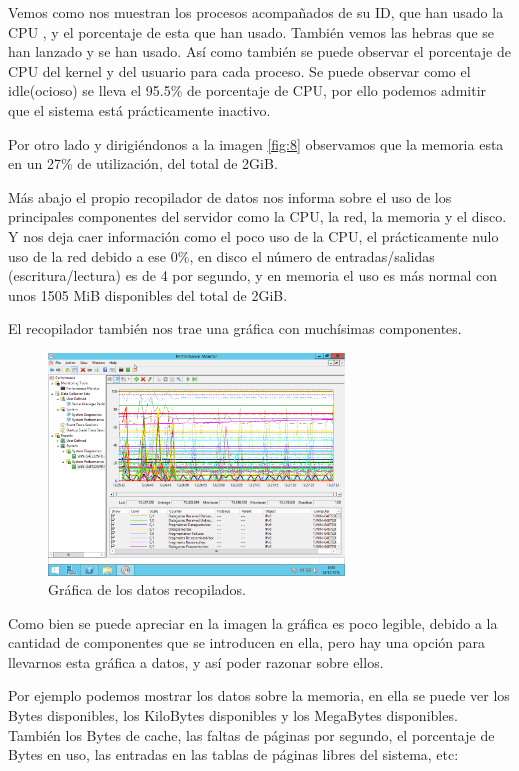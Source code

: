 Vemos como nos muestran los procesos acompañados de su ID, que han usado la CPU , y el porcentaje de esta que han usado. También vemos las hebras que se han lanzado y se han usado. Así como también se puede observar el porcentaje de CPU del kernel y del usuario para cada proceso.
Se puede observar como el idle(ocioso) se lleva el 95.5\% de porcentaje de CPU, por ello podemos admitir que el sistema está prácticamente inactivo.

Por otro lado y dirigiéndonos a la imagen \ref{fig:8} observamos que la memoria esta en un 27\% de utilización, del total de 2GiB.

Más abajo el propio recopilador de datos nos informa sobre el uso de los principales componentes del servidor como la CPU, la red, la memoria y el disco. Y nos deja caer información como el poco uso de la CPU, el prácticamente nulo uso de la red debido a ese 0\%, en disco el número de entradas/salidas (escritura/lectura) es de 4 por segundo, y en memoria el uso es más normal con unos 1505 MiB disponibles del total de 2GiB.

El recopilador también nos trae una gráfica con muchísimas componentes.

\begin{figure}[H]
	\begin{center}
		\includegraphics[width=0.7\textwidth]{Imagenes/Grafico_del_diagnostico}
		\caption{Gráfica de los datos recopilados.} \label{fig:10}
	\end{center}
\end{figure}

Como bien se puede apreciar en la imagen la gráfica es poco legible, debido a la cantidad de componentes que se introducen en ella, pero hay una opción para llevarnos esta gráfica a datos, y así poder razonar sobre ellos.

Por ejemplo podemos mostrar los datos sobre la memoria, en ella se puede ver los Bytes disponibles, los KiloBytes disponibles y los MegaBytes disponibles. También los Bytes de cache, las faltas de páginas por segundo, el porcentaje de Bytes en uso, las entradas en las tablas de páginas libres del sistema, etc:

